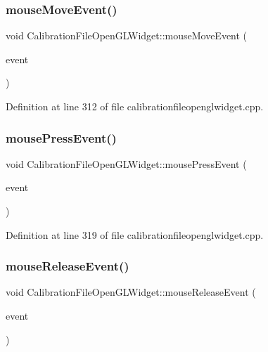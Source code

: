 \subsubsection{\texorpdfstring{mouseMoveEvent()}{mouseMoveEvent()}}
{\footnotesize\ttfamily void Calibration\+File\+Open\+G\+L\+Widget\+::mouse\+Move\+Event (\begin{DoxyParamCaption}\item[{Q\+Mouse\+Event $\ast$}]{event }\end{DoxyParamCaption})\hspace{0.3cm}{\ttfamily [protected]}}



Definition at line 312 of file calibrationfileopenglwidget.\+cpp.

\mbox{\label{class_calibration_file_open_g_l_widget_a9828d5b12688477eab2a0866cda50efd}} 
\subsubsection{\texorpdfstring{mousePressEvent()}{mousePressEvent()}}
{\footnotesize\ttfamily void Calibration\+File\+Open\+G\+L\+Widget\+::mouse\+Press\+Event (\begin{DoxyParamCaption}\item[{Q\+Mouse\+Event $\ast$}]{event }\end{DoxyParamCaption})\hspace{0.3cm}{\ttfamily [protected]}}



Definition at line 319 of file calibrationfileopenglwidget.\+cpp.

\mbox{\label{class_calibration_file_open_g_l_widget_a01f010d375221a076fb1fb3aee595669}} 
\subsubsection{\texorpdfstring{mouseReleaseEvent()}{mouseReleaseEvent()}}
{\footnotesize\ttfamily void Calibration\+File\+Open\+G\+L\+Widget\+::mouse\+Release\+Event (\begin{DoxyParamCaption}\item[{Q\+Mouse\+Event $\ast$}]{event }\end{DoxyParamCaption})\hspace{0.3cm}{\ttfamily [protected]}}



